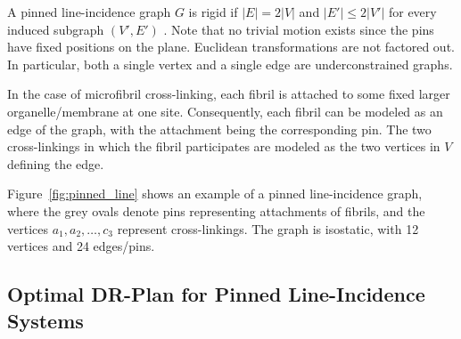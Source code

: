 %
%
A pinned line-incidence graph $G$ is rigid if $|E| = 2|V|$ and $|E'| \le 2|V'|$ for every induced subgraph $(V',E')$ \cite{sitharam2014incidence}. Note that no trivial motion exists since the pins have fixed positions on the plane. Euclidean transformations are not factored out. In particular, both a single vertex and a single edge are underconstrained graphs.




In the case of microfibril cross-linking, each fibril is attached to some fixed larger organelle/membrane at one site. Consequently, each fibril can be modeled as an edge of the graph, with the attachment being the corresponding pin. The two cross-linkings in which the fibril participates are modeled as the two vertices in $V$ defining the edge.



Figure~\ref{fig:pinned_line} shows an example of a pinned line-incidence graph, where the grey ovals denote pins representing attachments of fibrils, and the vertices $a_1,a_2,\ldots, c_3$ represent cross-linkings.
The graph is isostatic, with 12 vertices and 24 edges/pins.



\subsection{Optimal DR-Plan for Pinned Line-Incidence Systems}


